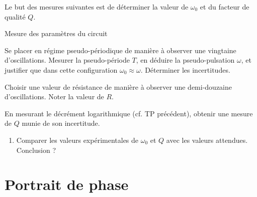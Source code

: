 \documentclass[a4paper,french,bookmarks]{article}
\begin{document}

Le but des mesures suivantes est de déterminer la valeur de $\omega_0$ et du facteur de qualité $Q$.

\begin{experience}{Mesure des paramètres du circuit}{}
    \begin{enumerate}
        \ithand Se placer en régime pseudo-périodique de manière à observer une vingtaine d’oscillations. Mesurer la pseudo-période $T$, en déduire la pseudo-pulsation $\omega$, et justifier que dans cette configuration $\omega_0 \approx \omega$. Déterminer les incertitudes.
        
        \ithand Choisir une valeur de résistance de manière à observer une demi-douzaine d’oscillations. Noter la valeur de $R$.
        
        \ithand  En mesurant le décrément logarithmique (cf. TP précédent), obtenir une mesure de $Q$ munie de son incertitude.
    \end{enumerate}
\end{experience}


\begin{enumerate}[resume]
    \item Comparer les valeurs expérimentales de $\omega_0$ et $Q$ avec les valeurs attendues. Conclusion ?
    
\end{enumerate}


\section{Portrait de phase}
\end{document}
